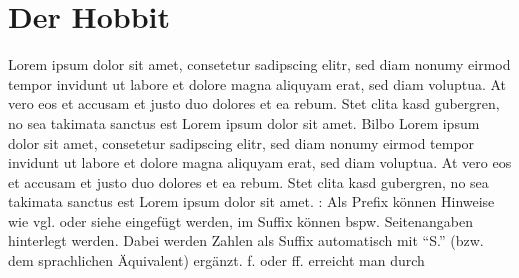 
\chapter{Der Hobbit}

Lorem ipsum dolor sit amet, consetetur sadipscing elitr, sed diam nonumy eirmod tempor invidunt ut labore et dolore magna aliquyam erat, sed diam voluptua. At vero eos et accusam et justo duo dolores et ea rebum. Stet clita kasd gubergren, no sea takimata sanctus est Lorem ipsum dolor sit amet. Bilbo  Lorem ipsum dolor sit amet, consetetur sadipscing elitr, sed diam nonumy eirmod tempor invidunt ut labore et dolore magna aliquyam erat, sed diam voluptua. At vero eos et accusam et justo duo dolores et ea rebum. Stet clita kasd gubergren, no sea takimata sanctus est Lorem ipsum dolor sit amet.
\cite[Vgl.][83\psq]{hdr}:  Als Prefix können Hinweise wie vgl. oder siehe eingefügt werden, im Suffix können bspw. Seitenangaben hinterlegt werden. Dabei werden Zahlen als Suffix automatisch mit “S.” (bzw. dem sprachlichen Äquivalent) ergänzt. f. oder ff. erreicht man durch
